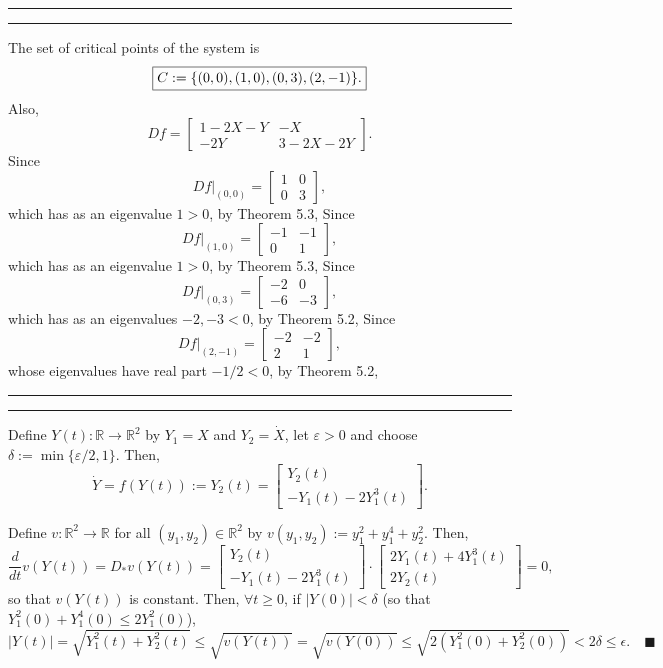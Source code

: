 \documentclass[11pt]{article}
\newcounter{questionCounter}
\newcounter{partCounter}[questionCounter]
\newenvironment{question}[2][\arabic{questionCounter}]{%
    \setcounter{partCounter}{0}%
    \vspace{.25in} \hrule \vspace{0.5em}%
        \noindent{\bf #2}%
    \vspace{0.8em} \hrule \vspace{.10in}%
    \addtocounter{questionCounter}{1}%
}{}
\newcommand{\mqed}{\quad \blacksquare}
\newcommand{\R}{\mathbb{R}} %
\newcommand{\e}{\varepsilon} %
\begin{document}
\newpage
\begin{question}{Problem 2}
The set of critical points of the system is
\[\mbox{\fbox{$C := \{(0,0),(1,0),(0,3),(2,-1)\}$.}}\]
Also,
\[Df =
\begin{bmatrix}
    1 - 2X - Y  & -X            \\
    -2Y         & 3 - 2X - 2Y
\end{bmatrix}.
\]
Since
\[Df\big|_{(0,0)} =
\begin{bmatrix}
    1   & 0 \\
    0   & 3
\end{bmatrix}
,\]
which has as an eigenvalue $1 > 0$, by Theorem 5.3, 
Since
\[Df\big|_{(1,0)} =
\begin{bmatrix}
    -1  & -1 \\
    0   & 1
\end{bmatrix}
,\]
which has as an eigenvalue $1 > 0$, by Theorem 5.3, 
Since
\[Df\big|_{(0,3)} =
\begin{bmatrix}
    -2  & 0 \\
    -6  & -3
\end{bmatrix}
,\]
which has as an eigenvalues $-2,-3 < 0$, by Theorem 5.2,  Since
\[Df\big|_{(2,-1)} =
\begin{bmatrix}
    -2  & -2 \\
    2   & 1
\end{bmatrix}
,\]
whose eigenvalues have real part $-1/2 < 0$, by Theorem 5.2, 
\end{question}

\begin{question}{Problem 3}
Define $Y(t) : \R \rightarrow \R^2$ by $Y_1 = X$ and $Y_2 = \dot X$, let
$\e > 0$ and choose $\delta := \min\{\e/2,1\}$. Then,
\[\dot Y
    = f(Y(t)) := Y_2(t)
    = \left[ \begin{array}{c} Y_2 (t)\\ -Y_1(t)-2Y_1^3(t) \end{array} \right].
\]

Define $v : \R^2 \rightarrow \R$ for all $(y_1,y_2) \in \R^2$ by
$v(y_1,y_2) := y_1^2 + y_1^4 + y_2^2$. Then,
\[\frac{d}{dt} v(Y(t))
    = D_*v(Y(t))
    = \left[ \begin{array}{c} Y_2 (t)\\ -Y_1(t)-2Y_1^3(t) \end{array} \right]
    \cdot \left[ \begin{array}{c} 2Y_1(t)+4Y_1^3(t) \\ 2Y_2(t) \end{array} \right]
    = 0,
\]
so that $v(Y(t))$ is constant. Then, $\forall t \geq 0$, if $|Y(0)| < \delta$
(so that $Y_1^2(0) + Y_1^4(0) \leq 2Y_1^2(0)$),
\[|Y(t)| = \sqrt{Y_1^2(t) + Y_2^2(t)}
    \leq \sqrt{v(Y(t))}
    = \sqrt{v(Y(0))}
    \leq \sqrt{2(Y_1^2(0) + Y_2^2(0))}
    < 2\delta
    \leq \epsilon. \mqed
\]
\end{question}
\end{document}
